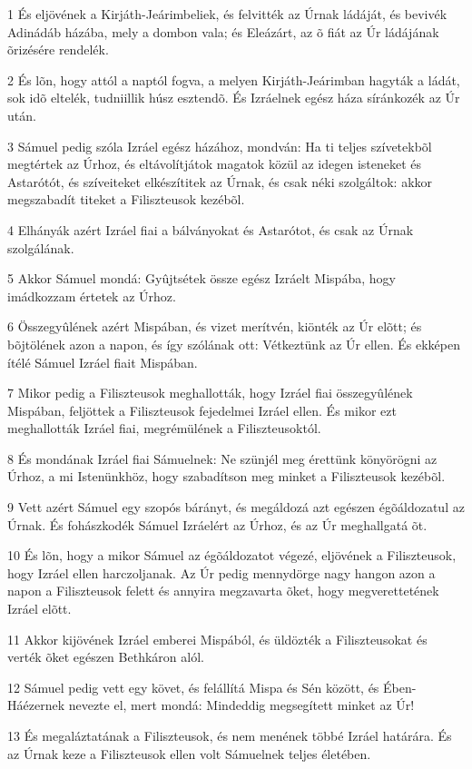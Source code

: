 \par 1 És eljövének a Kirjáth-Jeárimbeliek, és felvitték az Úrnak ládáját, és bevivék Adinádáb házába, mely a dombon vala; és Eleázárt, az õ fiát az Úr ládájának õrizésére rendelék.
\par 2 És lõn, hogy attól a naptól fogva, a melyen Kirjáth-Jeárimban hagyták a ládát, sok idõ eltelék, tudniillik húsz esztendõ. És Izráelnek egész háza síránkozék az Úr után.
\par 3 Sámuel pedig szóla Izráel egész házához, mondván: Ha ti teljes szívetekbõl megtértek az Úrhoz, és eltávolítjátok magatok közül az idegen isteneket és Astarótót, és szíveiteket elkészítitek az Úrnak, és csak néki szolgáltok: akkor megszabadít titeket a Filiszteusok kezébõl.
\par 4 Elhányák azért Izráel fiai a bálványokat és Astarótot, és csak az Úrnak szolgálának.
\par 5 Akkor Sámuel mondá: Gyûjtsétek össze egész Izráelt Mispába, hogy imádkozzam értetek az Úrhoz.
\par 6 Összegyûlének azért Mispában, és vizet merítvén, kiönték az Úr elõtt; és bõjtölének azon a napon, és így szólának ott: Vétkeztünk az Úr ellen. És ekképen ítélé Sámuel Izráel fiait Mispában.
\par 7 Mikor pedig a Filiszteusok meghallották, hogy Izráel fiai összegyûlének Mispában, feljöttek a Filiszteusok fejedelmei Izráel ellen. És mikor ezt meghallották Izráel fiai, megrémülének a Filiszteusoktól.
\par 8 És mondának Izráel fiai Sámuelnek: Ne szünjél meg érettünk könyörögni az Úrhoz, a mi Istenünkhöz, hogy szabadítson meg minket a Filiszteusok kezébõl.
\par 9 Vett azért Sámuel egy szopós bárányt, és megáldozá azt egészen égõáldozatul az Úrnak. És fohászkodék Sámuel Izráelért az Úrhoz, és az Úr meghallgatá õt.
\par 10 És lõn, hogy a mikor Sámuel az égõáldozatot végezé, eljövének a Filiszteusok, hogy Izráel ellen harczoljanak. Az Úr pedig mennydörge nagy hangon azon a napon a Filiszteusok felett és annyira megzavarta õket, hogy megverettetének Izráel elõtt.
\par 11 Akkor kijövének Izráel emberei Mispából, és üldözték a Filiszteusokat és verték õket egészen Bethkáron alól.
\par 12 Sámuel pedig vett egy követ, és felállítá Mispa és Sén között, és Ében-Háézernek nevezte el, mert mondá: Mindeddig megsegített minket az Úr!
\par 13 És megaláztatának a Filiszteusok, és nem menének többé Izráel határára. És az Úrnak keze a Filiszteusok ellen volt Sámuelnek teljes életében.
